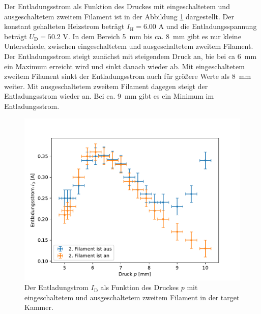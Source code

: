 Der Entladungsstrom als Funktion des Druckes mit eingeschaltetem und ausgeschaltetem zweitem Filament ist in der Abbildung \ref{fig:3_1_Druck} dargestellt. Der konstant gehalteten Heizstrom beträgt $ I_{\mathrm{H}} =6.00$ A und die Entladungsspannung beträgt $U_{\mathrm{D}}=50.2$ V. In dem Bereich \SI{5}{mm} bis ca. \SI{8}{mm} gibt es nur kleine Unterschiede, zwischen eingeschaltetem und ausgeschaltetem zweitem Filament. Der Entladungsstrom steigt zunächst mit steigendem Druck an, bie bei ca \SI{6}{mm} ein Maximum erreicht wird und sinkt danach wieder ab. Mit eingeschaltetem zweitem Filament sinkt der Entladungsstrom auch für größere Werte als \SI{8}{mm} weiter. Mit ausgeschaltetem zweitem Filament dagegen steigt der Entladungsstrom wieder an. Bei ca. \SI{9}{mm} gibt es ein Minimum im Entladungsstrom. 
\begin{figure}[H]
\centering
\includegraphics[scale=0.6]{3_1_Druck.pdf}
\caption{Der Entladungstrom $I_{\mathrm{D}}$ als Funktion des Druckes $p$ mit eingeschaltetem und ausgeschaltetem zweitem Filament in der target Kammer.}
\label{fig:3_1_Druck}
\end{figure}
